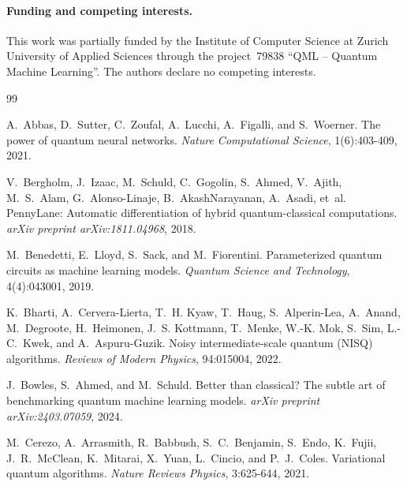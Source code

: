 \documentclass{article}
\begin{document}
\paragraph{Funding and competing interests.}
This work was partially funded by the Institute of Computer Science at Zurich University of Applied Sciences through the project \textnumero\,79838 ``QML -- Quantum Machine Learning''. The authors declare no competing interests.

\newpage
{
\small
\begin{thebibliography}{99}

A.~Abbas, D.~Sutter, C.~Zoufal, A.~Lucchi, A.~Figalli, and S.~Woerner.
\newblock The power of quantum neural networks.
\newblock \emph{Nature Computational Science}, 1(6):403-409, 2021.

V.~Bergholm, J.~Izaac, M.~Schuld, C.~Gogolin, S.~Ahmed, V.~Ajith, M.~S.~Alam, G.~Alonso-Linaje, B.~AkashNarayanan, A.~Asadi, et~al.
\newblock PennyLane: Automatic differentiation of hybrid quantum-classical computations.
\newblock \emph{arXiv preprint arXiv:1811.04968}, 2018.

M.~Benedetti, E.~Lloyd, S.~Sack, and M.~Fiorentini.
\newblock Parameterized quantum circuits as machine learning models.
\newblock \emph{Quantum Science and Technology}, 4(4):043001, 2019.

K.~Bharti, A.~Cervera-Lierta, T.~H. Kyaw, T.~Haug, S.~Alperin-Lea, A.~Anand, M.~Degroote, H.~Heimonen, J.~S. Kottmann, T.~Menke, W.-K. Mok, S.~Sim, L.-C.~Kwek, and A.~Aspuru-Guzik.
\newblock Noisy intermediate-scale quantum (NISQ) algorithms.
\newblock \emph{Reviews of Modern Physics}, 94:015004, 2022.

J.~Bowles, S.~Ahmed, and M.~Schuld.
\newblock Better than classical? The subtle art of benchmarking quantum machine learning models.
\newblock \emph{arXiv preprint arXiv:2403.07059}, 2024.

M.~Cerezo, A.~Arrasmith, R.~Babbush, S.~C.~Benjamin, S.~Endo, K.~Fujii, J.~R.~McClean, K.~Mitarai, X.~Yuan, L.~Cincio, and P.~J.~Coles.
\newblock Variational quantum algorithms.
\newblock \emph{Nature Reviews Physics}, 3:625-644, 2021.


\end{thebibliography}}
\end{document}
